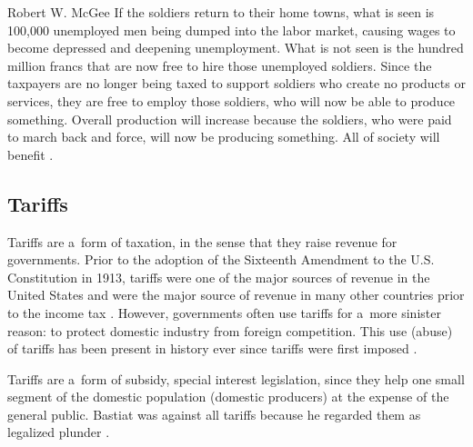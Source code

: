 \begin{artengenv}{Robert W. McGee}
If the soldiers return to their home towns, what is seen is 100,000 unemployed men being dumped into the labor market, causing wages to become depressed and deepening unemployment. What is not seen is the hundred million francs that are now free to hire those unemployed soldiers. Since the taxpayers are no longer being taxed to support soldiers who create no products or services, they are free to employ those soldiers, who will now be able to produce something. Overall production will increase because the soldiers, who were paid to march back and force, will now be producing something. All of society will benefit 
\parencite[][pp.6–7]{bastiat_selected_1964}.%




\subsection{Tariffs}



Tariffs are a~form of taxation, in the sense that they raise revenue for governments. Prior to the adoption of the Sixteenth Amendment to the U.S. Constitution in 1913, tariffs were one of the major sources of revenue in the United States and were the major source of revenue in many other countries prior to the income tax 
\parencite[][pp.269–270]{webber_history_1986}. %
 However, governments often use tariffs for a~more sinister reason: to protect domestic industry from foreign competition. This use (abuse) of tariffs has been present in history ever since tariffs were first imposed 
\parencite[][]{webber_history_1986}.%




Tariffs are a~form of subsidy, special interest legislation, since they help one small segment of the domestic population (domestic producers) at the expense of the general public. Bastiat was against all tariffs because he regarded them as legalized plunder 
\parencites[][]{bastiat_essais_1861}[][]{bastiat_libre-echange_1862}[][]{bastiat_correspondance_1862}[][]{bastiat_cobden_1864}[][]{bastiat_ce_1873}[][]{bastiat_sophismes_1873}[][]{bastiat_economic_1964}[][]{bastiat_economic_1964-1}[][]{bastiat_selected_1964}[][]{bastiat_law_1998}[][]{bastiat_bastiat_2007}.%





\end{artengenv}
